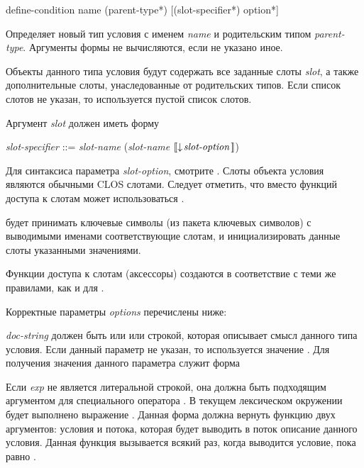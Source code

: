 \begin{defmac}
define-condition name ({parent-type}*)
                 [({slot-specifier}*) {option}*]

Определяет новый тип условия с именем \emph{name} и родительским типом
\emph{parent-type}. Аргументы формы не вычисляются, если не указано иное.

Объекты данного типа условия будут содержать все заданные слоты \emph{slot}, а
также дополнительные слоты, унаследованные от родительских типов. Если список
слотов не указан, то используется пустой список слотов.

Аргумент \emph{slot} должен иметь форму
\begin{tabbing}
\emph{slot-specifier\/} ::= \emph{slot-name\/} {\Mor} (\emph{slot-name\/}  $\lbrack\!\lbrack\downarrow\!\emph{slot-option}\,\rbrack\!\rbrack$)
\end{tabbing}
Для синтаксиса параметра \emph{slot-option}, смотрите .
Слоты объекта условия являются обычными CLOS слотами.
Следует отметить, что вместо функций доступа к слотам может использоваться
.

 будет принимать ключевые символы (из пакета ключевых
символов) с выводимыми именами соответствующие слотам, и инициализировать
данные слоты указанными значениями.

Функции доступа к слотам (аксессоры) создаются в соответствие с теми же
правилами, как и для .

Корректные параметры \emph{options} перечислены ниже:

\begin{flushdesc}

\item[\cd{(:documentation \emph{doc-string})}]

  \emph{doc-string} должен быть или  или строкой, которая описывает
  смысл данного типа условия. Если данный параметр не указан, то используется
  значение . Для получения значения данного параметра служит форма

\item[\cd{(:report \emph{exp})}]

  Если \emph{exp} не является литеральной строкой, она должна быть подходящим
  аргументом для специального оператора . В текущем лексическом
  окружении будет выполнено выражение . Данная форма
  должна вернуть функцию двух аргументов: условия и потока, которая будет
  выводить в поток описание данного условия. Данная функция вызывается всякий
  раз, когда выводится условие, пока  равно .


\end{flushdesc}
\end{defmac}
